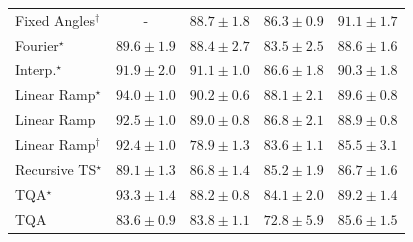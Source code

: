 \begin{tabular}{l|cccc|}
Fixed Angles$^\dagger$ & {\cellcolor[HTML]{000000}} \color[HTML]{F1F1F1} {\cellcolor{white}} \color{black} - & {\cellcolor[HTML]{086E3A}} \color[HTML]{F1F1F1} $88.7\pm 1.8$ & {\cellcolor[HTML]{187B3F}} \color[HTML]{F1F1F1} $86.3\pm 0.9$ & {\cellcolor[HTML]{006034}} \color[HTML]{F1F1F1} $91.1\pm 1.7$ \\
Fourier$^\star$ & {\cellcolor[HTML]{026A38}} \color[HTML]{F1F1F1} $89.6\pm 1.9$ & {\cellcolor[HTML]{0A703A}} \color[HTML]{F1F1F1} $88.4\pm 2.7$ & {\cellcolor[HTML]{298C48}} \color[HTML]{F1F1F1} $83.5\pm 2.5$ & {\cellcolor[HTML]{096F3A}} \color[HTML]{F1F1F1} $88.6\pm 1.6$ \\
Interp.$^\star$ & {\cellcolor[HTML]{005B32}} \color[HTML]{F1F1F1} $91.9\pm 2.0$ & {\cellcolor[HTML]{006034}} \color[HTML]{F1F1F1} $91.1\pm 1.0$ & {\cellcolor[HTML]{167A3F}} \color[HTML]{F1F1F1} $86.6\pm 1.8$ & {\cellcolor[HTML]{006636}} \color[HTML]{F1F1F1} $90.3\pm 1.8$ \\
Linear Ramp$^\star$ & {\cellcolor[HTML]{004D2C}} \color[HTML]{F1F1F1} $94.0\pm 1.0$ & {\cellcolor[HTML]{006636}} \color[HTML]{F1F1F1} $90.2\pm 0.6$ & {\cellcolor[HTML]{0C723B}} \color[HTML]{F1F1F1} $88.1\pm 2.1$ & {\cellcolor[HTML]{026A38}} \color[HTML]{F1F1F1} $89.6\pm 0.8$ \\
Linear Ramp & {\cellcolor[HTML]{005730}} \color[HTML]{F1F1F1} $92.5\pm 1.0$ & {\cellcolor[HTML]{066D39}} \color[HTML]{F1F1F1} $89.0\pm 0.8$ & {\cellcolor[HTML]{15793E}} \color[HTML]{F1F1F1} $86.8\pm 2.1$ & {\cellcolor[HTML]{076D39}} \color[HTML]{F1F1F1} $88.9\pm 0.8$ \\
Linear Ramp$^\dagger$ & {\cellcolor[HTML]{005830}} \color[HTML]{F1F1F1} $92.4\pm 1.0$ & {\cellcolor[HTML]{45AD5F}} \color[HTML]{F1F1F1} $78.9\pm 1.3$ & {\cellcolor[HTML]{298C48}} \color[HTML]{F1F1F1} $83.6\pm 1.1$ & {\cellcolor[HTML]{1D7F41}} \color[HTML]{F1F1F1} $85.5\pm 3.1$ \\
Recursive TS$^\star$ & {\cellcolor[HTML]{066D39}} \color[HTML]{F1F1F1} $89.1\pm 1.3$ & {\cellcolor[HTML]{15793E}} \color[HTML]{F1F1F1} $86.8\pm 1.4$ & {\cellcolor[HTML]{1F8142}} \color[HTML]{F1F1F1} $85.2\pm 1.9$ & {\cellcolor[HTML]{15793E}} \color[HTML]{F1F1F1} $86.7\pm 1.6$ \\
TQA$^\star$ & {\cellcolor[HTML]{00522E}} \color[HTML]{F1F1F1} $93.3\pm 1.4$ & {\cellcolor[HTML]{0B713B}} \color[HTML]{F1F1F1} $88.2\pm 0.8$ & {\cellcolor[HTML]{268846}} \color[HTML]{F1F1F1} $84.1\pm 2.0$ & {\cellcolor[HTML]{056C39}} \color[HTML]{F1F1F1} $89.2\pm 1.4$ \\
TQA & {\cellcolor[HTML]{298C48}} \color[HTML]{F1F1F1} $83.6\pm 0.9$ & {\cellcolor[HTML]{288A47}} \color[HTML]{F1F1F1} $83.8\pm 1.1$ & {\cellcolor[HTML]{84CB7E}} \color[HTML]{000000} $72.8\pm 5.9$ & {\cellcolor[HTML]{1D7F41}} \color[HTML]{F1F1F1} $85.6\pm 1.5$ \\

\end{tabular}
